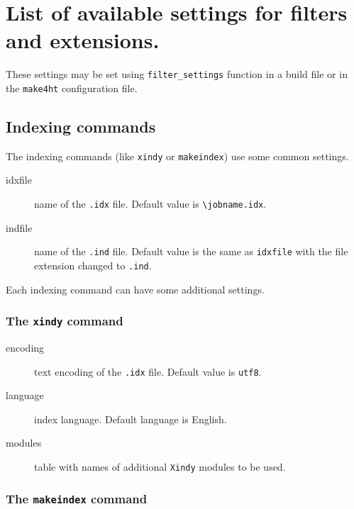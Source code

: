\hypertarget{list-of-available-settings-for-filters-and-extensions.}{%
\section{List of available settings for filters and
extensions.}\label{list-of-available-settings-for-filters-and-extensions.}}

These settings may be set using \texttt{filter\_settings} function in a
build file or in the \texttt{make4ht} configuration file.

\hypertarget{indexing-commands}{%
\subsection{Indexing commands}\label{indexing-commands}}

The indexing commands (like \texttt{xindy} or \texttt{makeindex}) use
some common settings.

\begin{description}
\item[idxfile]
name of the \texttt{.idx} file. Default value is
\texttt{\textbackslash{}jobname.idx}.
\item[indfile]
name of the \texttt{.ind} file. Default value is the same as
\texttt{idxfile} with the file extension changed to \texttt{.ind}.
\end{description}

Each indexing command can have some additional settings.

\hypertarget{the-xindy-command}{%
\subsubsection{\texorpdfstring{The \texttt{xindy}
command}{The xindy command}}\label{the-xindy-command}}

\begin{description}
\item[encoding]
text encoding of the \texttt{.idx} file. Default value is \texttt{utf8}.
\item[language]
index language. Default language is English.
\item[modules]
table with names of additional \texttt{Xindy} modules to be used.
\end{description}

\hypertarget{the-makeindex-command}{%
\subsubsection{\texorpdfstring{The \texttt{makeindex}
command}{The makeindex command}}\label{the-makeindex-command}}

